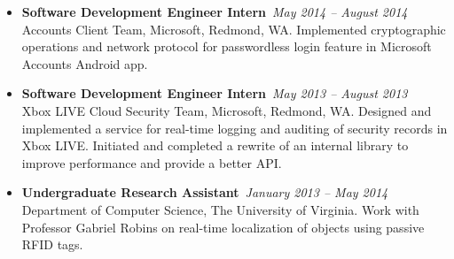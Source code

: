 \documentclass[10pt]{article}
\newenvironment{job}[3]{\setlength{\parskip}{0pt}%
	\begin{itemize}[label={},leftmargin=0cm,labelindent=0pt,nolistsep]%
		\item\textbf{#1}~\hfill\emph{#2}\\{#3}.}{\end{itemize}\medskip}
\begin{document}
\begin{job}{Software Development Engineer Intern}{May 2014 -- August 2014}{Accounts Client Team,
		Microsoft, Redmond, WA}
	Implemented cryptographic operations and network protocol for passwordless login feature in
	Microsoft Accounts Android app.
\end{job}

\begin{job}{Software Development Engineer Intern}{May 2013 -- August 2013}{Xbox LIVE Cloud Security
		Team, Microsoft, Redmond, WA}
	Designed and implemented a service for real-time logging and auditing of security records in
	Xbox LIVE. Initiated and completed a rewrite of an internal library to improve performance and
	provide a better API.
\end{job}

\begin{job}{Undergraduate Research Assistant}{January 2013 -- May 2014}{Department of Computer
		Science, The University of Virginia}
	Work with Professor Gabriel Robins on real-time localization of objects using passive RFID tags.
\end{job}
\end{document}
